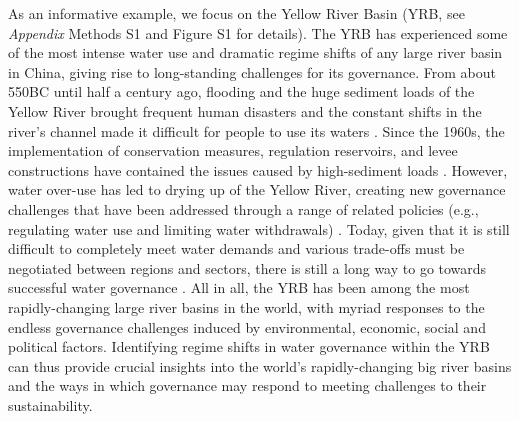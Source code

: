 \documentclass[9pt, twocolumn, twoside, lineno]{pnas-new}
\begin{document}
\label{introduction-section-3}
As an informative example, we focus on the Yellow River Basin (YRB, see \textit{Appendix} Methods S1 and Figure S1 for details). 
The YRB has experienced some of the most intense water use and dramatic regime shifts of any large river basin in China, giving rise to long-standing challenges for its governance.
From about 550BC until half a century ago, flooding and the huge sediment loads of the Yellow River brought frequent human disasters and the constant shifts in the river’s channel made it difficult for people to use its waters 
\cite{songSedimenttransportincreasing2020a,li2020}. 
Since the 1960s, the implementation of conservation measures, regulation reservoirs, and levee constructions have contained the issues caused by high-sediment loads
\cite{wangReducedsedimenttransport2016,wu2020}.
However, water over-use has led to drying up of the Yellow River, creating new governance challenges that have been addressed through a range of related policies (e.g., regulating water use and limiting water withdrawals) 
\cite{xia2012}.
Today, given that it is still difficult to completely meet water demands and various trade-offs must be negotiated between regions and sectors, there is still a long way to go towards successful water governance 
\cite{wangYellowRiverwater2019,wohlfartSocialecologicalchallenges2016}.
All in all, the YRB has been among the most rapidly-changing large river basins in the world, with myriad responses to the endless governance challenges induced by environmental, economic, social and political factors. 
Identifying regime shifts in water governance within the YRB can thus provide crucial insights into the world’s rapidly-changing big river basins and the ways in which governance may respond to meeting challenges to their sustainability.
\end{document}
